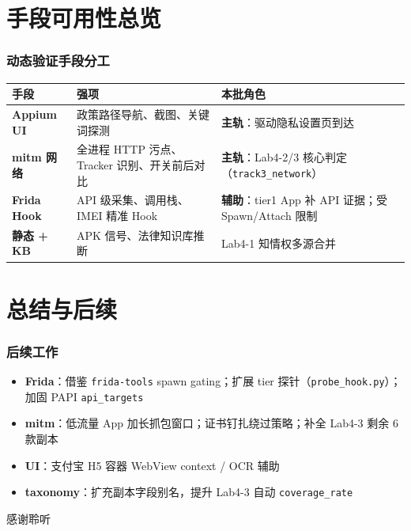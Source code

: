 \documentclass[AutoFakeBold,AutoFakeSlant]{beamer}
\begin{document}
\section{手段可用性总览}

\begin{frame}
    \frametitle{动态验证手段分工}
    \small
    \begin{tabularx}{\textwidth}{|l|X|X|}
        \hline
        \textbf{手段} & \textbf{强项} & \textbf{本批角色} \\
        \hline
        \textbf{Appium UI} & 政策路径导航、截图、关键词探测 & \textbf{主轨}：驱动隐私设置页到达 \\
        \hline
        \textbf{mitm 网络} & 全进程 HTTP 污点、Tracker 识别、开关前后对比 & \textbf{主轨}：Lab4-2/3 核心判定（\texttt{track3\_network}） \\
        \hline
        \textbf{Frida Hook} & API 级采集、调用栈、IMEI 精准 Hook & \textbf{辅助}：tier1 App 补 API 证据；受 Spawn/Attach 限制 \\
        \hline
        \textbf{静态 + KB} & APK 信号、法律知识库推断 & Lab4-1 知情权多源合并 \\
        \hline
    \end{tabularx}
\end{frame}

\section{总结与后续}

\begin{frame}
    \frametitle{后续工作}
    \small
    \begin{itemize}
        \item \textbf{Frida}：借鉴 \texttt{frida-tools} spawn gating；扩展 tier 探针（\texttt{probe\_hook.py}）；加固 PAPI \texttt{api\_targets}
        \item \textbf{mitm}：低流量 App 加长抓包窗口；证书钉扎绕过策略；补全 Lab4-3 剩余 6 款副本
        \item \textbf{UI}：支付宝 H5 容器 WebView context / OCR 辅助
        \item \textbf{taxonomy}：扩充副本字段别名，提升 Lab4-3 自动 \texttt{coverage\_rate}
    \end{itemize}
\end{frame}

\begin{frame}
    \centering
    \Huge 感谢聆听
\end{frame}
\end{document}
